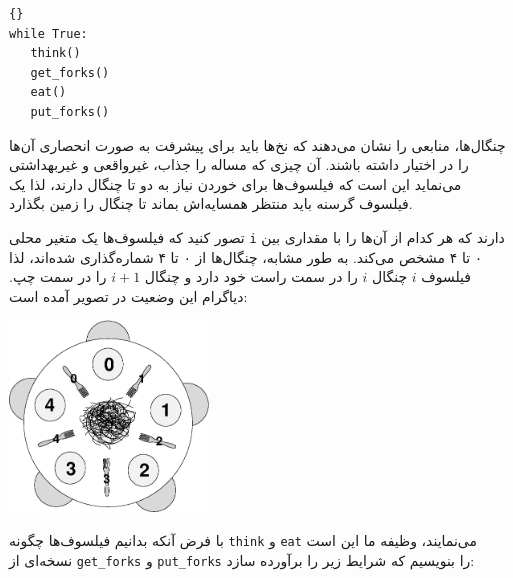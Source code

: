 \documentclass{book}
\begin{document}
\begin{latin}
\begin{latin}
\begin{lstlisting}[title=\rl{حلقه پایه فیلسوف}]{}
while True:
   think()
   get_forks()
   eat()
   put_forks()
\end{lstlisting}
\end{latin}
\end{latin}

    چنگال‌ها، منابعی را نشان می‌دهند که نخ‌ها باید برای پیشرفت به صورت انحصاری آن‌ها را در اختیار داشته باشند.
    آن چیزی که مساله را جذاب، غیرواقعی و غیربهداشتی می‌نماید این است که فیلسوف‌ها برای  خوردن نیاز به دو تا چنگال دارند، لذا 
    یک فیلسوف گرسنه باید منتظر همسایه‌اش بماند تا چنگال را زمین بگذارد. 

    تصور کنید که فیلسوف‌ها یک متغیر محلی {\tt i} دارند که هر کدام  از آن‌ها را با مقداری بین ۰ تا ۴ مشخص می‌کند. 
    به طور مشابه، چنگال‌ها از ۰ تا ۴ شماره‌گذاری شده‌اند، لذا فیلسوف $i$ چنگال $i$ را در سمت راست خود دارد و چنگال  $i+1$  را در سمت چپ.
    دیاگرام این وضعیت در تصویر آمده است: 

\centerline{\includegraphics[height=2in]{table.eps}}

    با فرض آنکه بدانیم فیلسوف‌ها چگونه {\tt think} و {\tt eat} می‌نمایند، وظیفه ما این است نسخه‌ای از {\tt get\_forks} و {\tt put\_forks}
    را بنویسیم که شرایط زیر را برآورده سازد:
\end{document}
